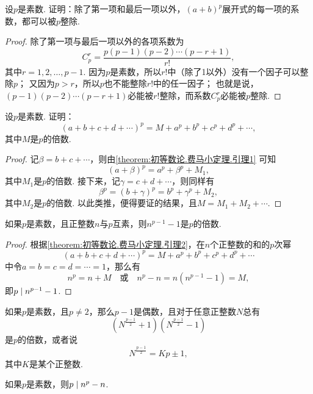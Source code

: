 \begin{lemma}\label{theorem:初等数论.费马小定理.引理1}
设\(p\)是素数.
证明：除了第一项和最后一项以外，\((a+b)^p\)展开式的每一项的系数，都可以被\(p\)整除.
\begin{proof}
除了第一项与最后一项以外的各项系数为\[
C_p^r = \frac{p(p-1)(p-2)\dotsm(p-r+1)}{r!},
\]其中\(r=1,2,\dotsc,p-1\).
因为\(p\)是素数，所以\(r!\)中（除了1以外）没有一个因子可以整除\(p\)；
又因为\(p>r\)，所以\(p\)也不能整除\(r!\)中的任一因子；
也就是说，\((p-1)(p-2)\dotsm(p-r+1)\)必能被\(r!\)整除，而系数\(C_p^r\)必能被\(p\)整除.
\end{proof}
\end{lemma}

\begin{lemma}\label{theorem:初等数论.费马小定理.引理2}
设\(p\)是素数.
证明：\[
(a+b+c+d+\dotsb)^p = M + a^p + b^p + c^p + d^p + \dotsb,
\]其中\(M\)是\(p\)的倍数.
\begin{proof}
记\(\beta=b+c+\dotsb\)，则由\cref{theorem:初等数论.费马小定理.引理1} 可知\[
(a+\beta)^p = a^p + \beta^p + M_1,
\]其中\(M_1\)是\(p\)的倍数.
接下来，记\(\gamma=c+d+\dotsb\)，则同样有\[
\beta^p = (b+\gamma)^p = b^p + \gamma^p + M_2,
\]其中\(M_2\)是\(p\)的倍数.
以此类推，便得要证的结果，且\(M = M_1+M_2+\dotsb\).
\end{proof}
\end{lemma}

\begin{theorem}[费马小定理]\label{theorem:初等数论.费马小定理}
如果\(p\)是素数，且正整数\(n\)与\(p\)互素，则\(n^{p-1}-1\)是\(p\)的倍数.
\begin{proof}
根据\cref{theorem:初等数论.费马小定理.引理2}，在\(n\)个正整数的和的\(p\)次幂\[
(a+b+c+d+\dotsb)^p = M + a^p + b^p + c^p + d^p + \dotsb
\]中令\(a=b=c=d=\dotsb=1\)，那么有\[
n^p = n + M
\quad\text{或}\quad
n^p - n = n(n^{p-1}-1) = M,
\]即\(\truediv{n^{p-1}-1}{p}\).
\end{proof}
\end{theorem}

\begin{corollary}
如果\(p\)是素数，且\(p\neq2\)，那么\(p-1\)是偶数，且对于任意正整数\(N\)总有\[
\left(N^{\frac{p-1}{2}}+1\right)
\left(N^{\frac{p-1}{2}}-1\right)
\]是\(p\)的倍数，或者说\[
N^{\frac{p-1}{2}} = Kp\pm1,
\]其中\(K\)是某个正整数.
\end{corollary}

\begin{corollary}[费马小定理']
如果\(p\)是素数，则\(\truediv{n^p-n}{p}\).
\end{corollary}

